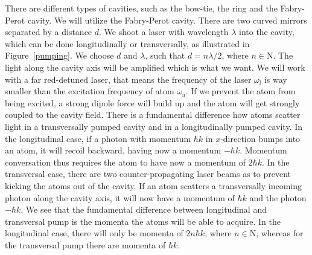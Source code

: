 There are different types of cavities, such as the bow-tie, the ring and the Fabry-Perot cavity. We will utilize the Fabry-Perot cavity. There are two curved mirrors separated by a distance $d$. We shoot a laser with wavelength $\lambda$ into the cavity, which can be done longitudinally or transversally, as illustrated in Figure~\ref{pumping}. We choose $d$ and $\lambda$, such that $d = n \lambda / 2$, where $n \in \mathrm{N}$. The light along the cavity axis will be amplified which is what we want. We will work with a far red-detuned laser, that means the frequency of the laser $\omega_\text{l}$ is way smaller than the excitation frequency of atom $\omega_\text{a}$. If we prevent the atom from being excited, a strong dipole force will build up and the atom will get strongly coupled to the cavity field. There is a fundamental difference how atoms scatter light in a transversally pumped cavity and in a longitudinally pumped cavity. In the longitudinal case, if a photon with momentum $\hbar k$ in $x$-direction bumps into an atom, it will recoil backward, having now a momentum $-\hbar k$. Momentum conversation thus requires the atom to have now a momentum of $2\hbar k$. In the transversal case, there are two counter-propagating laser beams as to prevent kicking the atoms out of the cavity. If an atom scatters a transversally incoming photon along the cavity axis, it will now have a momentum of $\hbar k$ and the photon $-\hbar k$. We see that the fundamental difference between longitudinal and transversal pump is the momenta the atoms will be able to acquire. In the longitudinal case, there will only be momenta of $2n\hbar k$, where $n \in \mathrm{N}$, whereas for the transversal pump there are momenta of $\hbar k$.

